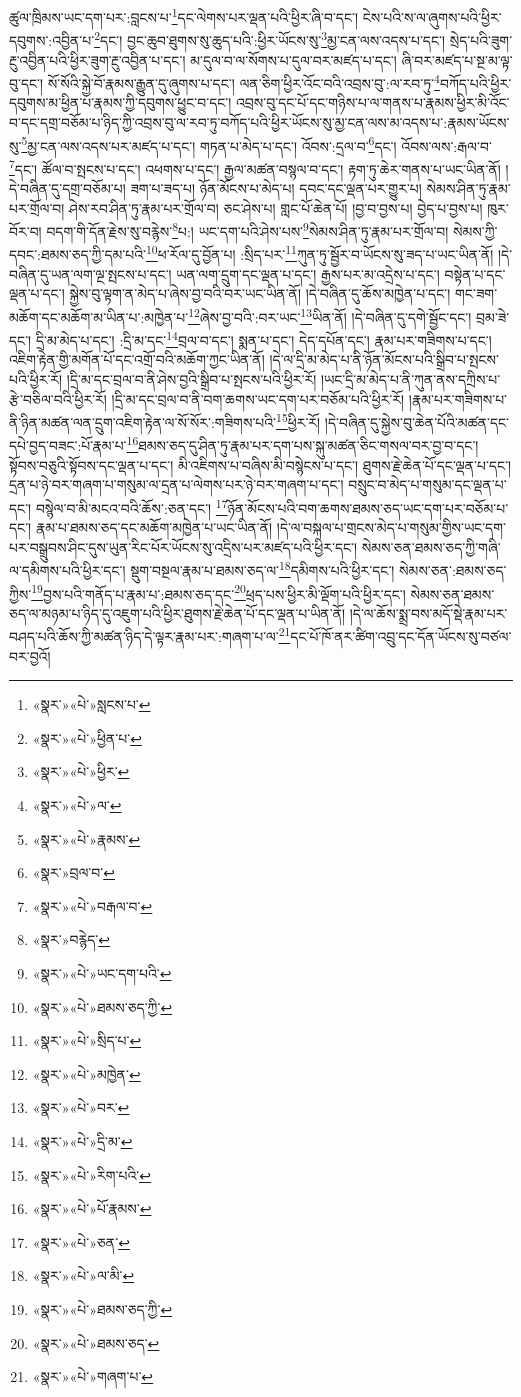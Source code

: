 ཚུལ་ཁྲིམས་ཡང་དག་པར་:བླངས་པ་\footnote{«སྣར་»«པེ་»སླངས་པ་}དང་ལེགས་པར་ལྡན་པའི་ཕྱིར་ཞི་བ་དང་། ངེས་པའི་ས་ལ་ཞུགས་པའི་ཕྱིར་དབུགས་:འབྱིན་པ་\footnote{«སྣར་»«པེ་»ཕྱིན་པ་}དང་། བྱང་ཆུབ་ཐུགས་སུ་ཆུད་པའི་:ཕྱིར་ཡོངས་སུ་\footnote{«སྣར་»«པེ་»ཕྱིར་}མྱ་ངན་ལས་འདས་པ་དང་། སྲེད་པའི་ཟུག་རྔུ་འབྱིན་པའི་ཕྱིར་ཟུག་རྔུ་འབྱིན་པ་དང་། མ་དུལ་བ་ལ་སོགས་པ་དུལ་བར་མཛད་པ་དང་། ཞི་བར་མཛད་པ་སྔ་མ་ལྟ་བུ་དང་། སོ་སོའི་སྐྱེ་བོ་རྣམས་རྒྱུན་དུ་ཞུགས་པ་དང་། ལན་ཅིག་ཕྱིར་འོང་བའི་འབྲས་བུ་:ལ་རབ་ཏུ་\footnote{«སྣར་»«པེ་»ལ་}བཀོད་པའི་ཕྱིར་དབུགས་མ་ཕྱིན་པ་རྣམས་ཀྱི་དབུགས་ཕྱུང་བ་དང་། འབྲས་བུ་དང་པོ་དང་གཉིས་པ་ལ་གནས་པ་རྣམས་ཕྱིར་མི་འོང་བ་དང་དགྲ་བཅོམ་པ་ཉིད་ཀྱི་འབྲས་བུ་ལ་རབ་ཏུ་བཀོད་པའི་ཕྱིར་ཡོངས་སུ་མྱ་ངན་ལས་མ་འདས་པ་:རྣམས་ཡོངས་སུ་\footnote{«སྣར་»«པེ་»རྣམས་}མྱ་ངན་ལས་འདས་པར་མཛད་པ་དང་། གཏན་པ་མེད་པ་དང་། འོབས་:དྲལ་བ་\footnote{«སྣར་»བྲལ་བ་}དང་། འོབས་ལས་:རྒལ་བ་\footnote{«སྣར་»«པེ་»བརྒལ་བ་}དང་། ཚོལ་བ་སྤངས་པ་དང་། འཕགས་པ་དང་། རྒྱལ་མཚན་བསྙལ་བ་དང་། རྟག་ཏུ་ཆེར་གནས་པ་ཡང་ཡིན་ནོ། །དེ་བཞིན་དུ་དགྲ་བཅོམ་པ། ཟག་པ་ཟད་པ། ཉོན་མོངས་པ་མེད་པ། དབང་དང་ལྡན་པར་གྱུར་པ། སེམས་ཤིན་ཏུ་རྣམ་པར་གྲོལ་བ། ཤེས་རབ་ཤིན་ཏུ་རྣམ་པར་གྲོལ་བ། ཅང་ཤེས་པ། གླང་པོ་ཆེན་པོ། །བྱ་བ་བྱས་པ། བྱེད་པ་བྱས་པ། ཁུར་བོར་བ། བདག་གི་དོན་རྗེས་སུ་བརྙེས་\footnote{«སྣར་»བརྙེད་}པ:། ཡང་དག་པའི་ཤེས་པས་\footnote{«སྣར་»«པེ་»ཡང་དག་པའི་}སེམས་ཤིན་ཏུ་རྣམ་པར་གྲོལ་བ། སེམས་ཀྱི་དབང་:ཐམས་ཅད་ཀྱི་དམ་པའི་\footnote{«སྣར་»«པེ་»ཐམས་ཅད་ཀྱི་}ཕ་རོལ་དུ་བྱོན་པ། :སྲིད་པར་\footnote{«སྣར་»«པེ་»སྲིད་པ་}ཀུན་ཏུ་སྦྱོར་བ་ཡོངས་སུ་ཟད་པ་ཡང་ཡིན་ནོ། །དེ་བཞིན་དུ་ཡན་ལག་ལྔ་སྤངས་པ་དང་། ཡན་ལག་དྲུག་དང་ལྡན་པ་དང་། རྒྱས་པར་མ་འདྲེས་པ་དང་། བསྟེན་པ་དང་ལྡན་པ་དང་། སྐྱེས་བུ་ལྟག་ན་མེད་པ་ཞེས་བྱ་བའི་བར་ཡང་ཡིན་ནོ། །དེ་བཞིན་དུ་ཆོས་མཁྱེན་པ་དང་། གང་ཟག་མཆོག་དང་མཆོག་མ་ཡིན་པ་:མཁྱེན་པ་\footnote{«སྣར་»«པེ་»མཁྱེན་}ཞེས་བྱ་བའི་:བར་ཡང་\footnote{«སྣར་»«པེ་»བར་}ཡིན་ནོ། །དེ་བཞིན་དུ་དགེ་སྦྱོང་དང་། བྲམ་ཟེ་དང་། དྲི་མ་མེད་པ་དང་། :དྲི་མ་དང་\footnote{«སྣར་»«པེ་»དྲི་མ་}བྲལ་བ་དང་། སྨན་པ་དང་། དེད་དཔོན་དང་། རྣམ་པར་གཟིགས་པ་དང་། འཇིག་རྟེན་གྱི་མགོན་པོ་དང་འགྲོ་བའི་མཆོག་ཀྱང་ཡིན་ནོ། །དེ་ལ་དྲི་མ་མེད་པ་ནི་ཉོན་མོངས་པའི་སྒྲིབ་པ་སྤངས་པའི་ཕྱིར་རོ། །དྲི་མ་དང་བྲལ་བ་ནི་ཤེས་བྱའི་སྒྲིབ་པ་སྤངས་པའི་ཕྱིར་རོ། །ཡང་དྲི་མ་མེད་པ་ནི་ཀུན་ནས་དཀྲིས་པ་རྩེ་བཅིལ་བའི་ཕྱིར་རོ། །དྲི་མ་དང་བྲལ་བ་ནི་བག་ཆགས་ཡང་དག་པར་བཅོམ་པའི་ཕྱིར་རོ། །རྣམ་པར་གཟིགས་པ་ནི་ཉིན་མཚན་ལན་དྲུག་འཇིག་རྟེན་ལ་སོ་སོར་:གཟིགས་པའི་\footnote{«སྣར་»«པེ་»རིག་པའི་}ཕྱིར་རོ། །དེ་བཞིན་དུ་སྐྱེས་བུ་ཆེན་པོའི་མཚན་དང་དཔེ་བྱད་བཟང་:པོ་རྣམ་པ་\footnote{«སྣར་»«པེ་»པོ་རྣམས་}ཐམས་ཅད་དུ་ཤིན་ཏུ་རྣམ་པར་དག་པས་སྐུ་མཚན་ཅིང་གསལ་བར་བྱ་བ་དང་། སྟོབས་བཅུའི་སྟོབས་དང་ལྡན་པ་དང་། མི་འཇིགས་པ་བཞིས་མི་བསྙེངས་པ་དང་། ཐུགས་རྗེ་ཆེན་པོ་དང་ལྡན་པ་དང་། དྲན་པ་ཉེ་བར་གཞག་པ་གསུམ་ལ་དྲན་པ་ལེགས་པར་ཉེ་བར་གཞག་པ་དང་། བསྲུང་བ་མེད་པ་གསུམ་དང་ལྡན་པ་དང་། བསྙེལ་བ་མི་མངའ་བའི་ཆོས་:ཅན་དང་། \footnote{«སྣར་»«པེ་»ཅན་}ཉོན་མོངས་པའི་བག་ཆགས་ཐམས་ཅད་ཡང་དག་པར་བཅོམ་པ་དང་། རྣམ་པ་ཐམས་ཅད་དང་མཆོག་མཁྱེན་པ་ཡང་ཡིན་ནོ། །དེ་ལ་བསྐལ་པ་གྲངས་མེད་པ་གསུམ་གྱིས་ཡང་དག་པར་བསྒྲུབས་ཤིང་དུས་ཡུན་རིང་པོར་ཡོངས་སུ་འདྲིས་པར་མཛད་པའི་ཕྱིར་དང་། སེམས་ཅན་ཐམས་ཅད་ཀྱི་གཞི་ལ་དམིགས་པའི་ཕྱིར་དང་། སྡུག་བསྔལ་རྣམ་པ་ཐམས་ཅད་ལ་\footnote{«སྣར་»«པེ་»ལ་མི་}དམིགས་པའི་ཕྱིར་དང་། སེམས་ཅན་:ཐམས་ཅད་ཀྱིས་\footnote{«སྣར་»«པེ་»ཐམས་ཅད་ཀྱི་}བྱས་པའི་གནོད་པ་རྣམ་པ་:ཐམས་ཅད་དང་\footnote{«སྣར་»«པེ་»ཐམས་ཅད་}ཕྲད་པས་ཕྱིར་མི་ལྡོག་པའི་ཕྱིར་དང་། སེམས་ཅན་ཐམས་ཅད་ལ་མཉམ་པ་ཉིད་དུ་འཇུག་པའི་ཕྱིར་ཐུགས་རྗེ་ཆེན་པོ་དང་ལྡན་པ་ཡིན་ནོ། །དེ་ལ་ཆོས་སྨྲ་བས་མདོ་སྡེ་རྣམ་པར་བཤད་པའི་ཆོས་ཀྱི་མཚན་ཉིད་དེ་ལྟར་རྣམ་པར་:གཞག་པ་ལ་\footnote{«སྣར་»«པེ་»གཞག་པ་}དང་པོ་ཁོ་ནར་ཚིག་འབྲུ་དང་དོན་ཡོངས་སུ་བཙལ་བར་བྱའོ། 